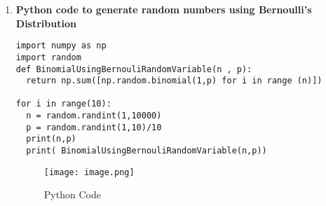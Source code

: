 \documentclass{article}
\begin{document}
\begin{enumerate}
\newpage
\item
\textbf{Python code to generate random numbers using Bernoulli's Distribution}
\Large

\begin{lstlisting}
import numpy as np
import random
def BinomialUsingBernouliRandomVariable(n , p):
  return np.sum([np.random.binomial(1,p) for i in range (n)])

for i in range(10):
  n = random.randint(1,10000)
  p = random.randint(1,10)/10
  print(n,p)
  print( BinomialUsingBernouliRandomVariable(n,p))
\end{lstlisting}

\begin{figure}[htp]
    \centering
    \caption{Python Code}
    \texttt{[image: image.png]}
    \label{fig:CodePy}
\end{figure}






\end{enumerate}
\end{document}
